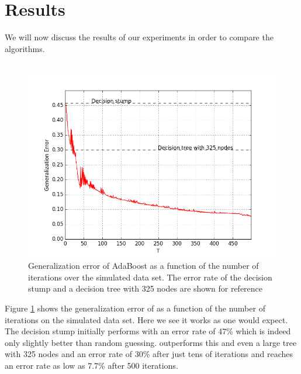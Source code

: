 \section{Results}
We will now discuss the results of our experiments in order to compare the algorithms.
\subsection{\adaB}
\label{subsec:AdaPracPerf}
\begin{figure}[!ht]
  \centering
      \includegraphics[width=\graphWidth]{generated/ADGD.png}
  \caption{Generalization error of AdaBoost as a function of the number of iterations over the simulated data set. The error rate of the decision stump and a decision tree with 325 nodes are shown for reference}
      \label{fig:adaBGD}
\end{figure}


\par Figure \ref{fig:adaBGD} shows the generalization error of \adaB as a function of the number of iterations on the simulated data set. Here we see it works as one would expect. The decision stump initially performs with an error rate of 47\% which is indeed only slightly better than random guessing. \adaB outperforms this and even a large tree with 325 nodes and an error rate of 30\% after just tens of iterations and reaches an error rate as low as 7.7\% after 500 iterations.

